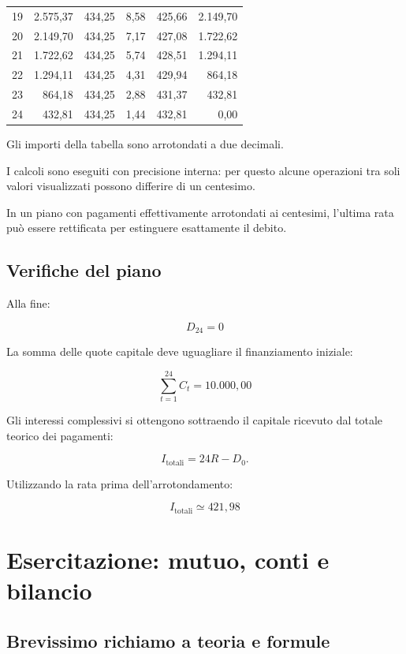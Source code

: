 \begin{center}
\begin{tabular}{|c|r|r|r|r|r|}
        19 & 2.575,37 & 434,25 & 8,58 & 425,66 & 2.149,70 \\
        20 & 2.149,70 & 434,25 & 7,17 & 427,08 & 1.722,62 \\
        21 & 1.722,62 & 434,25 & 5,74 & 428,51 & 1.294,11 \\
        22 & 1.294,11 & 434,25 & 4,31 & 429,94 & 864,18 \\
        23 & 864,18 & 434,25 & 2,88 & 431,37 & 432,81 \\
        24 & 432,81 & 434,25 & 1,44 & 432,81 & 0,00 \\
        \hline
    \end{tabular}
\end{center}

\noindent Gli importi della tabella
sono arrotondati a due decimali.

\noindent I calcoli sono eseguiti
con precisione interna:
per questo alcune operazioni
tra soli valori visualizzati
possono differire di un centesimo.

\noindent In un piano con pagamenti
effettivamente arrotondati ai centesimi,
l'ultima rata può essere rettificata
per estinguere esattamente il debito.


\subsection*{Verifiche del piano}

\noindent Alla fine:

\[
\boxed{D_{24}=0}
\]

\noindent La somma delle quote capitale
deve uguagliare il finanziamento iniziale:

\[
\boxed{
\sum_{t=1}^{24}C_t=10.000{,}00
}
\]

\noindent Gli interessi complessivi
si ottengono sottraendo
il capitale ricevuto
dal totale teorico dei pagamenti:

\[
I_{\text{totali}}=24R-D_0.
\]

\noindent Utilizzando la rata
prima dell'arrotondamento:

\[
\boxed{
I_{\text{totali}}\simeq421{,}98
}
\]


\section{Esercitazione:
mutuo, conti e bilancio}

\subsection*{Brevissimo richiamo a teoria e formule}

